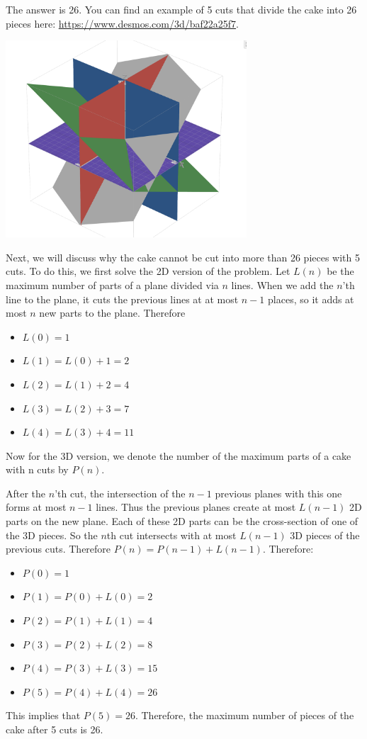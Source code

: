 \begin{solution}
	The answer is 26. You can find an example of 5 cuts that divide the cake into 26 pieces here: \url{https://www.desmos.com/3d/baf22a25f7}.\\[0.2cm]
	\begin{center}
	\includegraphics[width=9cm]{58/figs/58_sol.png}
	\end{center}
	Next, we will discuss why the cake cannot be cut into more than 26 pieces with 5 cuts. To do this, we first solve the 2D version of the problem. Let $L(n)$ be the maximum number of parts of a plane divided via $n$ lines. When we add the $n$'th line to the plane, it cuts the previous lines at at most $n-1$ places, so it adds at most $n$ new parts to the plane. Therefore
	\begin{itemize}
		\item $L(0)=1$
		\item $L(1)=L(0)+1=2$
		\item $L(2)=L(1)+2=4$
		\item $L(3)=L(2)+3=7$
		\item $L(4)=L(3)+4=11$
	\end{itemize}
	
	Now for the 3D version, we denote the number of the maximum parts of a cake with n cuts by $P(n)$.
	
	After the $n$'th cut, the intersection of the $n-1$ previous planes with this one forms at most $n-1$ lines. Thus the previous planes create at most $L(n-1)$ 2D parts on the new plane. Each of these 2D parts can be the cross-section of one of the 3D pieces. So the $n$th cut intersects with at most $L(n-1)$ 3D pieces of the previous cuts. Therefore $ P(n)=P(n-1)+L(n-1)$. Therefore:
	\begin{itemize}
		\item $P(0)=1$
		\item $P(1)=P(0)+L(0)=2$
		\item $P(2)=P(1)+L(1)=4$
		\item $P(3)=P(2)+L(2)=8$
		\item $P(4)=P(3)+L(3)=15$
		\item $P(5)=P(4)+L(4)=26$
	\end{itemize}
	This implies that  $P(5)=26$. Therefore, the maximum number of pieces of the cake after 5 cuts is 26.
\end{solution}
